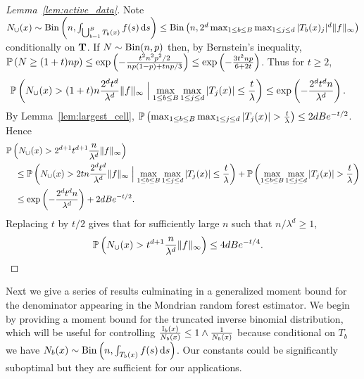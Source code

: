 \begin{proof}[Lemma~\ref{lem:active_data}]

  Note
  $N_\cup(x) \sim
  \Bin\left(n, \int_{\bigcup_{b=1}^{B} T_b(x)} f(s) \diff s \right)
  \leq \Bin\left(n, 2^d \max_{1 \leq b \leq B} \max_{1 \leq j \leq d}
  |T_b(x)_j|^d \|f\|_\infty \right)$
  conditionally on $\bT$.
  If $N \sim \Bin(n,p)$ then, by Bernstein's inequality,
  $\P\left( N \geq (1 + t) n p\right)
  \leq \exp\left(-\frac{t^2 n^2 p^2 / 2}{n p(1-p) + t n p / 3}\right)
  \leq \exp\left(-\frac{3t^2 n p}{6 + 2t}\right)$.
  Thus for $t \geq 2$,
  \begin{align*}
    \P \left( N_{\cup}(x) > (1+t) n \frac{2^d t^d}{\lambda^d}
      \|f\|_\infty
      \Bigm| \max_{1 \leq b \leq B} \max_{1 \leq j \leq d}
      |T_j(x)| \leq \frac{t}{\lambda}
    \right)
    &\leq
    \exp\left(- \frac{2^d t^{d} n}{\lambda^d}\right).
  \end{align*}
  By Lemma~\ref{lem:largest_cell},
  $\P \left( \max_{1 \leq b \leq B} \max_{1 \leq j \leq d}
  |T_j(x)| > \frac{t}{\lambda} \right)
  \leq 2 d B e^{-t/2}$.
  Hence
  \begin{align*}
    &\P \left( N_{\cup}(x) > 2^{d+1} t^{d+1} \frac{n}{\lambda^d}
      \|f\|_\infty
    \right) \\
    &\quad\leq
    \P \left( N_{\cup}(x) > 2 t n \frac{2^d t^d}{\lambda^d}
      \|f\|_\infty
      \Bigm| \max_{1 \leq b \leq B} \max_{1 \leq j \leq d}
      |T_j(x)| \leq \frac{t}{\lambda}
    \right)
    + \P \left( \max_{1 \leq b \leq B} \max_{1 \leq j \leq d}
      |T_j(x)| > \frac{t}{\lambda}
    \right) \\
    &\quad\leq
    \exp\left(- \frac{2^d t^{d} n}{\lambda^d}\right)
    + 2 d B e^{-t/2}.
  \end{align*}
  Replacing $t$ by $t/2$
  gives that for sufficiently large $n$ such that
  $n / \lambda^d \geq 1$,
  \begin{align*}
    \P \left( N_{\cup}(x) > t^{d+1}
      \frac{n}{\lambda^d}
      \|f\|_\infty
    \right)
    &\leq
    4 d B e^{-t/4}.
  \end{align*}
\end{proof}

Next we give a series of results culminating in a
generalized moment bound for the denominator appearing
in the Mondrian random forest estimator.
We begin by providing a moment bound for the truncated inverse binomial
distribution, which will be useful for controlling
$\frac{\I_b(x)}{N_b(x)} \leq 1 \wedge \frac{1}{N_b(x)}$
because conditional on $T_b$ we have
$N_b(x) \sim \Bin \left( n, \int_{T_b(x)} f(s) \diff s \right)$.
Our constants could be significantly suboptimal but they are sufficient
for our applications.

